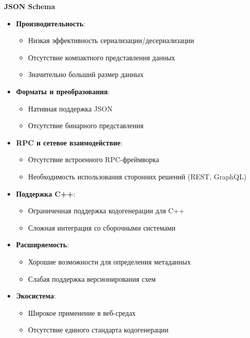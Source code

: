         \textbf{JSON Schema}

            \begin{itemize}
                \item \textbf{Производительность}:
                \begin{itemize}
                    \item Низкая эффективность сериализации/десериализации
                    \item Отсутствие компактного представления данных
                    \item Значительно больший размер данных
                \end{itemize}

                \item \textbf{Форматы и преобразования}:
                \begin{itemize}
                    \item Нативная поддержка JSON
                    \item Отсутствие бинарного представления
                \end{itemize}

                \item \textbf{RPC и сетевое взаимодействие}:
                \begin{itemize}
                    \item Отсутствие встроенного RPC-фреймворка
                    \item Необходимость использования сторонних решений (REST, GraphQL)
                \end{itemize}

                \item \textbf{Поддержка C++}:
                \begin{itemize}
                    \item Ограниченная поддержка кодогенерации для C++
                    \item Сложная интеграция со сборочными системами
                \end{itemize}

                \item \textbf{Расширяемость}:
                \begin{itemize}
                    \item Хорошие возможности для определения метаданных
                    \item Слабая поддержка версионирования схем
                \end{itemize}

                \item \textbf{Экосистема}:
                \begin{itemize}
                    \item Широкое применение в веб-средах
                    \item Отсутствие единого стандарта кодогенерации
                \end{itemize}
            \end{itemize}

